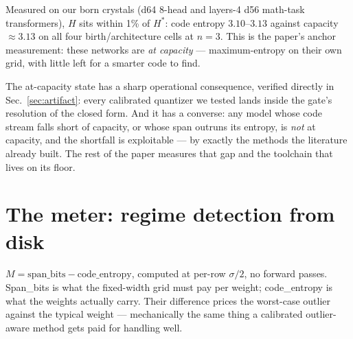 \documentclass[11pt]{article}
\begin{document}
Measured on our born crystals (d64 8-head and layers-4 d56 math-task
transformers), $H$ sits within 1\% of $H^*$: code entropy $3.10$--$3.13$ against
capacity $\approx 3.13$ on all four birth/architecture cells at $n{=}3$.
This is the paper's anchor measurement: these networks are \emph{at capacity}
--- maximum-entropy on their own grid, with little left for a smarter code to
find.

The at-capacity state has a sharp operational consequence, verified directly in
Sec.~\ref{sec:artifact}: every calibrated quantizer we tested lands inside the
gate's resolution of the closed form. And it has a converse: any model whose
code stream falls short of capacity, or whose span outruns its entropy, is
\emph{not} at capacity, and the shortfall is exploitable --- by exactly the
methods the literature already built. The rest of the paper measures that gap and
the toolchain that lives on its floor.

\section{The meter: regime detection from disk}
\label{sec:meter}

$M = \text{span\_bits} - \text{code\_entropy}$, computed at per-row $\sigma/2$,
no forward passes. Span\_bits is what the fixed-width grid must pay per weight;
code\_entropy is what the weights actually carry. Their difference prices the
worst-case outlier against the typical weight --- mechanically the same thing a
calibrated outlier-aware method gets paid for handling well. %
\end{document}
